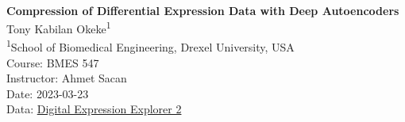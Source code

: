 \documentclass[11pt]{article}
\begin{document}
\begin{flushleft}
    \hrulefill\\
    {\large\textbf{Compression of Differential Expression Data with Deep Autoencoders}}\\
    Tony Kabilan Okeke\textsuperscript{1}\\
    \textsuperscript{1}School of Biomedical Engineering, Drexel University, USA\\
    \vspace{1em}
    Course: BMES 547\\
    Instructor: Ahmet Sacan\\
    Date: 2023-03-23\\
    Data: \href{https://dee2.io/}{Digital Expression Explorer 2} \\
    \hrulefill
\end{flushleft}


\begin{multicols*}{2}
    \raggedcolumns

    
    \vspace{1em}

    
    \vspace{1em}

    
    \vspace{1em}

    
    \vspace{1em}

    
    \vspace{1em}

    
    \vspace{1em}

    
    

    \balance
\end{multicols*}
\end{document}
